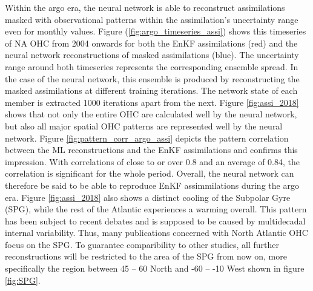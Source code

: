 \documentclass[11pt,a4paper]{scrreprt}	%
\newcommand{\dg}{\degree}
\begin{document}
 	Within the argo era, the neural network is able to reconstruct assimilations masked with observational patterns within the assimilation's uncertainty range even for monthly values. Figure (\ref{fig:argo_timeseries_assi}) shows this timeseries of NA OHC from 2004 onwards for both the EnKF assimilations (red) and the neural network reconstructions of masked assimilations (blue). The uncertainty range around both timeseries represents the corresponding ensemble spread. In the case of the neural network, this ensemble is produced by reconstructing the masked assimilations at different training iterations. The network state of each member is extracted 1000 iterations apart from the next. Figure \ref{fig:assi_2018} shows that not only the entire OHC are calculated well by the neural network, but also all major spatial OHC patterns are represented well by the neural network. Figure \ref{fig:pattern_corr_argo_assi} depicts the pattern correlation between the ML reconstructions and the EnKF assimilations and confirms this impression. With correlations of close to or over 0.8 and an average of 0.84, the correlation is significant for the whole period. Overall, the neural network can therefore be said to be able to reproduce EnKF assimmilations during the argo era. Figure \ref{fig:assi_2018} also shows a distinct cooling of the Subpolar Gyre (SPG), while the rest of the Atlantic experiences a warming overall. This pattern has been subject to recent debates and is supposed to be caused by multidecadal internal variability. Thus, many publications concerned with North Atlantic OHC focus on the SPG. To guarantee comparibility to other studies, all further reconstructions will be restricted to the area of the SPG from now on, more specifically the region between 45 -- 60 \dg North and -60 -- -10 \dg West shown in figure \ref{fig:SPG}. \\
\end{document}
